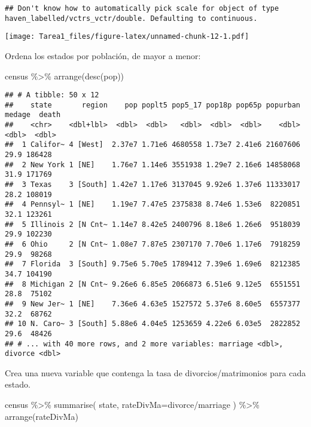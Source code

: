 \documentclass[
]{article}
\newenvironment{Shaded}{\begin{snugshade}}{\end{snugshade}}
\newcommand{\AttributeTok}[1]{\textcolor[rgb]{0.77,0.63,0.00}{#1}}
\newcommand{\FunctionTok}[1]{\textcolor[rgb]{0.00,0.00,0.00}{#1}}
\newcommand{\NormalTok}[1]{#1}
\newcommand{\SpecialCharTok}[1]{\textcolor[rgb]{0.00,0.00,0.00}{#1}}
\begin{document}
\begin{verbatim}
## Don't know how to automatically pick scale for object of type haven_labelled/vctrs_vctr/double. Defaulting to continuous.
\end{verbatim}

\texttt{[image: Tarea1\_files/figure-latex/unnamed-chunk-12-1.pdf]}

Ordena los estados por población, de mayor a menor:

\begin{Shaded}
\begin{Highlighting}[]
\NormalTok{census }\SpecialCharTok{\%\textgreater{}\%} \FunctionTok{arrange}\NormalTok{(}\FunctionTok{desc}\NormalTok{(pop))}
\end{Highlighting}
\end{Shaded}

\begin{verbatim}
## # A tibble: 50 x 12
##    state       region    pop poplt5 pop5_17 pop18p pop65p popurban medage  death
##    <chr>    <dbl+lbl>  <dbl>  <dbl>   <dbl>  <dbl>  <dbl>    <dbl>  <dbl>  <dbl>
##  1 Califor~ 4 [West]  2.37e7 1.71e6 4680558 1.73e7 2.41e6 21607606   29.9 186428
##  2 New York 1 [NE]    1.76e7 1.14e6 3551938 1.29e7 2.16e6 14858068   31.9 171769
##  3 Texas    3 [South] 1.42e7 1.17e6 3137045 9.92e6 1.37e6 11333017   28.2 108019
##  4 Pennsyl~ 1 [NE]    1.19e7 7.47e5 2375838 8.74e6 1.53e6  8220851   32.1 123261
##  5 Illinois 2 [N Cnt~ 1.14e7 8.42e5 2400796 8.18e6 1.26e6  9518039   29.9 102230
##  6 Ohio     2 [N Cnt~ 1.08e7 7.87e5 2307170 7.70e6 1.17e6  7918259   29.9  98268
##  7 Florida  3 [South] 9.75e6 5.70e5 1789412 7.39e6 1.69e6  8212385   34.7 104190
##  8 Michigan 2 [N Cnt~ 9.26e6 6.85e5 2066873 6.51e6 9.12e5  6551551   28.8  75102
##  9 New Jer~ 1 [NE]    7.36e6 4.63e5 1527572 5.37e6 8.60e5  6557377   32.2  68762
## 10 N. Caro~ 3 [South] 5.88e6 4.04e5 1253659 4.22e6 6.03e5  2822852   29.6  48426
## # ... with 40 more rows, and 2 more variables: marriage <dbl>, divorce <dbl>
\end{verbatim}

Crea una nueva variable que contenga la tasa de divorcios/matrimonios
para cada estado.

\begin{Shaded}
\begin{Highlighting}[]
\NormalTok{census }\SpecialCharTok{\%\textgreater{}\%} \FunctionTok{summarise}\NormalTok{( state, }\AttributeTok{rateDivMa=}\NormalTok{divorce}\SpecialCharTok{/}\NormalTok{marriage ) }\SpecialCharTok{\%\textgreater{}\%} \FunctionTok{arrange}\NormalTok{(rateDivMa)}
\end{Highlighting}
\end{Shaded}
\end{document}
